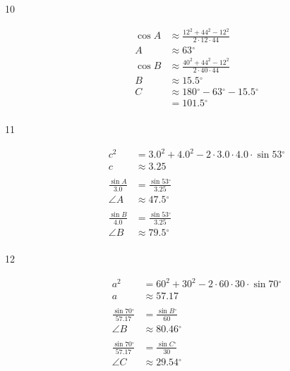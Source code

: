 \documentclass{exam}
\newcommand{\dg}{\ensuremath{^\circ}}
\begin{document}
\begin{description}
      \item[10] 
        \begin{align*}
          \cos A & \approx \frac{ 12^2 + 44^2 - 12^2}{2 \cdot 12 \cdot 44} \\
          A      & \approx \boxed{ 63 \dg }
          \\
          \cos B & \approx \frac{ 40^2 + 44^2 - 12^2}{2 \cdot 40 \cdot 44} \\
          B      & \approx \boxed{ 15.5 \dg }
          \\
          C & \approx 180 \dg - 63 \dg - 15.5 \dg \\
            & = \boxed{ 101.5 \dg } \\
        \end{align*}

      \item[11]
        \begin{align*}
          c^2 & = 3.0^2 + 4.0^2 - 2 \cdot 3.0 \cdot 4.0 \cdot \sin 53 \dg \\
          c   & \approx \boxed{ 3.25 } \\
          \\
          \frac{\sin A}{3.0} &= \frac{\sin 53 \dg}{3.25} \\
          \angle A & \approx \boxed{ 47.5 \dg } \\
          \\
          \frac{\sin B}{4.0} &= \frac{\sin 53 \dg}{3.25} \\
          \angle B & \approx \boxed{ 79.5 \dg } \\
        \end{align*}

      \item[12]
        \begin{align*}
          a^2 & = 60^2 + 30^2 - 2 \cdot 60 \cdot 30 \cdot \sin 70 \dg \\
          a   & \approx \boxed{ 57.17 } \\
          \\
          \frac{\sin 70 \dg}{57.17} &= \frac{\sin B \dg}{60} \\
          \angle B & \approx \boxed{ 80.46 \dg } \\
          \\
          \frac{\sin 70 \dg}{57.17} &= \frac{\sin C \dg}{30} \\
          \angle C & \approx \boxed{ 29.54 \dg } \\
        \end{align*}


\end{description}
\end{document}
